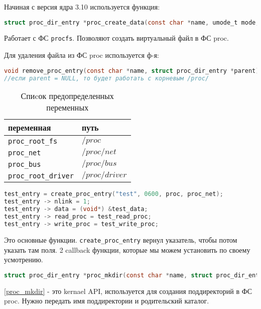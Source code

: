 Начиная с версия ядра 3.10 используется функция: \
\begin{lstlisting}[language=c]
struct proc_dir_entry *proc_create_data(const char *name, umode_t mode, struct proc_dir_entry *parent, const struct file_operations *proc_fops, void *data);
\end{lstlisting}
Работает с ФС \verb|procfs|. Позволяют создать виртуальный файл в ФС proc. 

Для удаления файла из ФС proc используется ф-я: 
\begin{lstlisting}[language=c]
void remove_proc_entry(const char *name, struct proc_dir_entry *parent);
//если parent = NULL, то будет работать с корневым /proc/
\end{lstlisting}

\begin{table}[H]
\caption{Спиcок предопределенных переменных}
\begin{tabular}{|l|l|}
\hline
переменная & путь \\
\hline
\verb|proc_root_fs| & $/proc$ \\
\verb|proc_net| & $/proc/net$ \\
\verb|proc_bus| & $/proc/bus$ \\
\verb|proc_root_driver| & $/proc/driver$ \\
\hline
\end{tabular}
\end{table}

\begin{lstlisting}[language=c, caption=Последовательность действий для инициализации файла "/proc/net/test"]
test_entry = create_proc_entry("test", 0600, proc, proc_net);
test_entry -> nlink = 1;
test_entry -> data = (void*) &test_data;
test_entry -> read_proc = test_read_proc;
test_entry -> write_proc = test_write_proc;
\end{lstlisting}

Это основные функции. \verb|create_proc_entry|  вернул указатель, чтобы потом указать там поля. 2 callback функции, которые мы можем установить по своему усмотрению.

\begin{lstlisting}[language=c, label=proc_mkdir, caption=создание поддиректории]
struct proc_dir_entry *proc_mkdir(const char *name, struct proc_dir_entry *parent); 
\end{lstlisting}

\ref{proc_mkdir} - это kernael API, используется для создания поддиректорий в ФС proc. Нужно передать имя поддиректории и родительский каталог.

